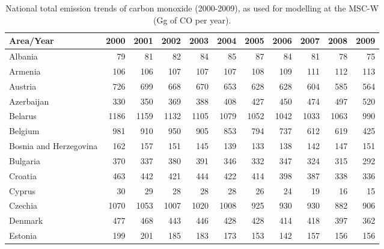  \begin{table}
 \caption{National total emission trends of  carbon monoxide (2000-2009), as used for modelling at the MSC-W (Gg of CO per year).}
 
 
 \vspace{15pt}
 
 \scriptsize
 \centering
 \begin{tabular}{|l|r|r|r|r|r|r|r|r|r|r|}
 \hline
                     Area/Year&   2000&   2001&   2002&   2003&   2004&   2005&   2006&   2007&   2008&   2009\\\hline\hline
                       Albania&     79&     81&     82&     84&     85&     87&     84&     81&     78&     75\\\hline
                       Armenia&    106&    106&    107&    107&    107&    108&    109&    111&    112&    113\\\hline
                       Austria&    726&    699&    668&    670&    653&    628&    628&    604&    585&    564\\\hline
                    Azerbaijan&    330&    350&    369&    388&    408&    427&    450&    474&    497&    520\\\hline
                       Belarus&   1186&   1159&   1132&   1105&   1079&   1052&   1042&   1033&   1063&    990\\\hline
                       Belgium&    981&    910&    950&    905&    853&    794&    737&    612&    619&    425\\\hline
        Bosnia and Herzegovina&    162&    157&    151&    145&    139&    133&    138&    142&    147&    151\\\hline
                      Bulgaria&    370&    337&    380&    391&    346&    332&    347&    324&    315&    292\\\hline
                       Croatia&    463&    442&    421&    444&    422&    414&    398&    387&    338&    336\\\hline
                        Cyprus&     30&     29&     28&     28&     28&     26&     24&     19&     16&     15\\\hline
                       Czechia&   1070&   1053&   1007&   1020&   1008&    925&    930&    930&    882&    906\\\hline
                       Denmark&    477&    468&    443&    446&    428&    428&    414&    418&    397&    362\\\hline
                       Estonia&    199&    201&    185&    183&    173&    153&    142&    157&    156&    156\\\hline

\end{tabular}
\end{table}
